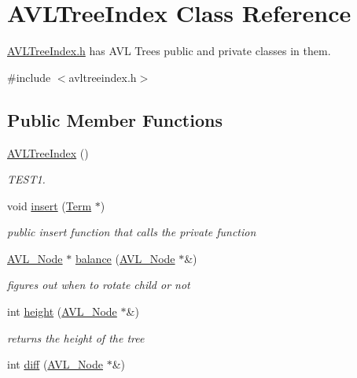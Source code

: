 \hypertarget{class_a_v_l_tree_index}{}\section{A\+V\+L\+Tree\+Index Class Reference}
\label{class_a_v_l_tree_index}


\hyperlink{avltreeindex_8h}{A\+V\+L\+Tree\+Index.\+h} has A\+V\+L Trees public and private classes in them.  




{\ttfamily \#include $<$avltreeindex.\+h$>$}

\subsection*{Public Member Functions}
\begin{DoxyCompactItemize}
\item 
\hyperlink{class_a_v_l_tree_index_aba8dc551ea4963a8082991f52bb19c25}{A\+V\+L\+Tree\+Index} ()
\begin{DoxyCompactList}\small\item\em T\+E\+S\+T1. \end{DoxyCompactList}\item 
void \hyperlink{class_a_v_l_tree_index_a0954e6e43e3742008bf18e71a8afc319}{insert} (\hyperlink{class_term}{Term} $\ast$)
\begin{DoxyCompactList}\small\item\em public insert function that calls the private function \end{DoxyCompactList}\item 
\hyperlink{struct_a_v_l___node}{A\+V\+L\+\_\+\+Node} $\ast$ \hyperlink{class_a_v_l_tree_index_a580c720dab8aa7dd31ca4fc20718cd80}{balance} (\hyperlink{struct_a_v_l___node}{A\+V\+L\+\_\+\+Node} $\ast$\&)
\begin{DoxyCompactList}\small\item\em figures out when to rotate child or not \end{DoxyCompactList}\item 
int \hyperlink{class_a_v_l_tree_index_abb5a43355e33d3af6ab29b3a1fcfd93d}{height} (\hyperlink{struct_a_v_l___node}{A\+V\+L\+\_\+\+Node} $\ast$\&)
\begin{DoxyCompactList}\small\item\em returns the height of the tree \end{DoxyCompactList}\item 
int \hyperlink{class_a_v_l_tree_index_a95127bb897068de9eb3a589d0abfac53}{diff} (\hyperlink{struct_a_v_l___node}{A\+V\+L\+\_\+\+Node} $\ast$\&)

\end{DoxyCompactItemize}

